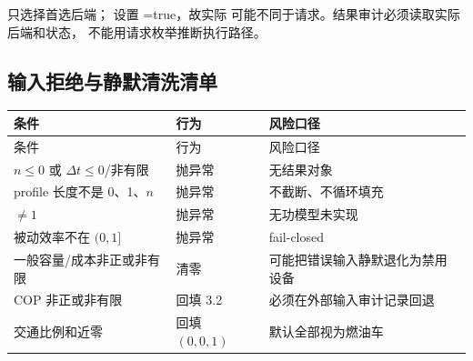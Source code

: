  只选择首选后端； 设置
=true，故实际  可能不同于请求。结果审计必须读取实际后端和状态，
不能用请求枚举推断执行路径。

\subsection{输入拒绝与静默清洗清单}

\begin{center}\footnotesize
\begin{longtable}{@{}L{5.0cm}L{4.5cm}L{5.5cm}@{}}
\toprule
条件 & 行为 & 风险口径\\\midrule
\endfirsthead
\toprule 条件 & 行为 & 风险口径\\\midrule\endhead
$n\le0$ 或 $\Delta t\le0$/非有限 & 抛异常 & 无结果对象\\
profile 长度不是 0、1、$n$ & 抛异常 & 不截断、不循环填充\\
$\ne1$ & 抛异常 & 无功模型未实现\\
被动效率不在 $(0,1]$ & 抛异常 & fail-closed\\
一般容量/成本非正或非有限 & 清零 & 可能把错误输入静默退化为禁用设备\\
COP 非正或非有限 & 回填 3.2 & 必须在外部输入审计记录回退\\
交通比例和近零 & 回填 $(0,0,1)$ & 默认全部视为燃油车\\
\bottomrule
\end{longtable}
\end{center}
